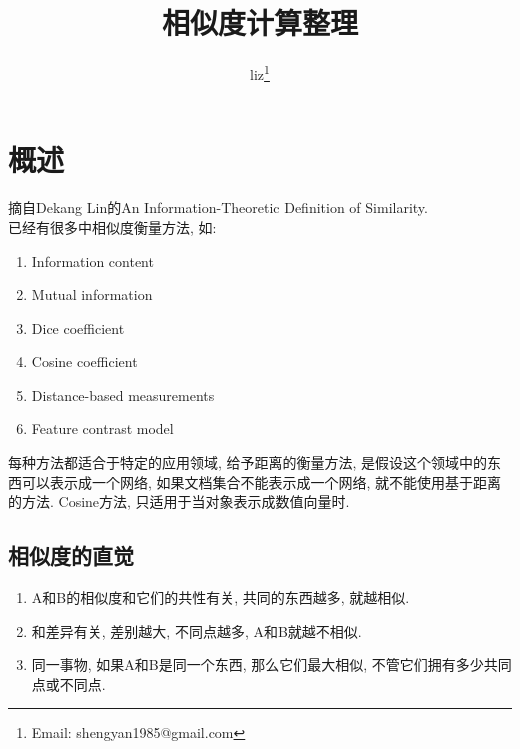 \documentclass[a4paper,10pt,english]{article}
\title{相似度计算整理}
\author{liz\footnote{Email: shengyan1985@gmail.com}}
\begin{document}
\maketitle
\tableofcontents
\clearpage

\section{概述}
摘自Dekang Lin的An Information-Theoretic Definition of Similarity. \\
已经有很多中相似度衡量方法, 如:
\begin{enumerate}
\item{Information content}
\item{Mutual information}
\item{Dice coefficient}
\item{Cosine coefficient}
\item{Distance-based measurements}
\item{Feature contrast model}
\end{enumerate}
每种方法都适合于特定的应用领域, 给予距离的衡量方法, 是假设这个领域中的东西可以表示成一个网络, 如果文档集合不能表示成一个网络, 就不能使用基于距离的方法. Cosine方法, 只适用于当对象表示成数值向量时. 

\subsection{相似度的直觉}
\begin{enumerate}
\item{A和B的相似度和它们的共性有关},  共同的东西越多, 就越相似.
\item{和差异有关}, 差别越大, 不同点越多, A和B就越不相似.
\item{同一事物}, 如果A和B是同一个东西, 那么它们最大相似, 不管它们拥有多少共同点或不同点.
\end{enumerate}
\end{document}
